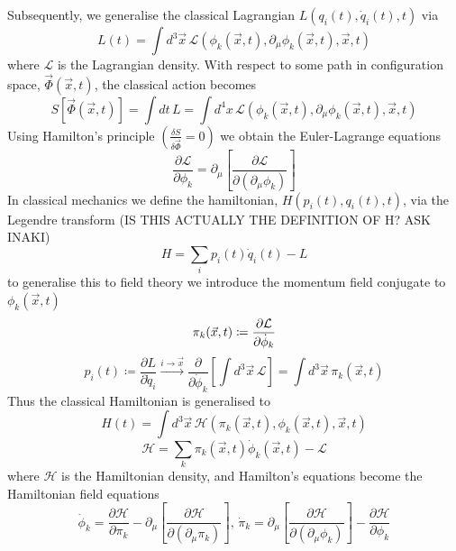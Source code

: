 \documentclass[11pt, a4paper]{article}
\theoremstyle{definition}
\theoremstyle{plain}
\begin{document}
Subsequently, we generalise the classical Lagrangian $L(q_i(t), \dot{q}_i(t), t)$ via
\begin{equation}
  L(t) = \int{d^{3}\vec{x}\,\mathcal{L}(\phi_k(\vec{x}, t),\partial_{\mu}\phi_k(\vec{x}, t), \vec{x}, t)}
\end{equation}
where $\mathcal{L}$ is the Lagrangian density. With respect to some path
in configuration space, $\vec{\Phi}(\vec{x}, t)$, the classical action becomes 
\begin{equation}
  S\left[\vec{\Phi}(\vec{x}, t) \right] = \int{dt\,L} 
  = \int{d^4x\,\mathcal{L}(\phi_k(\vec{x}, t),\partial_{\mu}\phi_k(\vec{x}, t), \vec{x}, t)}
\end{equation}
Using Hamilton's principle $\left( \frac{\delta S}{\delta \vec{\Phi} } = 0 \right)$ we obtain
the Euler-Lagrange equations 
\begin{equation}
  \frac{\partial \mathcal{L}}{\partial \phi_k}
  = \partial_\mu \left[ \frac{\partial \mathcal{L}}{\partial(\partial_\mu{\phi_k}) } \right]
\end{equation}
In classical mechanics we define the hamiltonian, $H(p_i(t), q_i(t), t)$, via the
Legendre transform (IS THIS ACTUALLY THE DEFINITION OF H? ASK INAKI)
\begin{equation}
  H = \sum_{i}{p_i(t)\dot{q}_i(t) - L}
\end{equation}
to generalise this to field theory we introduce the momentum field conjugate to 
$\phi_k(\vec{x}, t)$
\begin{equation}
  \pi_k(\vec{x}, t) \coloneq \frac{\partial \mathcal{L} }{\partial \dot{\phi}_k} \\
\end{equation}
\begin{equation}
  p_i(t) \coloneq \frac{\partial L}{\partial \dot{q}_i} \xrightarrow{i \rightarrow \vec{x}}
  \frac{\partial}{\partial \dot{\phi}_k} \left[ \int{d^3\vec{x}\,\mathcal{L}} \right]
  = \int{d^3\vec{x}\,\pi_k(\vec{x}, t)}
\end{equation}
Thus the classical Hamiltonian is generalised to
\begin{equation}
  H(t) = \int{d^3\vec{x}\,\mathcal{H}(\pi_k(\vec{x}, t), \phi_k(\vec{x}, t), \vec{x}, t) }
\end{equation}
\begin{equation}
  \mathcal{H} = \sum_{k}{\pi_k(\vec{x}, t)\dot{\phi}_k(\vec{x}, t) - \mathcal{L}}
\end{equation}
where $\mathcal{H}$ is the Hamiltonian density, and Hamilton's equations become
the Hamiltonian field equations
\begin{equation}
  \dot{\phi}_k = \frac{\partial \mathcal{H}}{\partial \pi_k}
  - \partial_\mu \left[ \frac{\partial \mathcal{H}}{\partial (\partial_\mu \pi_k)} \right],\,
  \dot{\pi}_k = \partial_\mu \left[ \frac{\partial \mathcal{H}}{\partial (\partial_\mu \phi_k)} \right]
  - \frac{\partial \mathcal{H}}{\partial \phi_k}
\end{equation}
\end{document}
